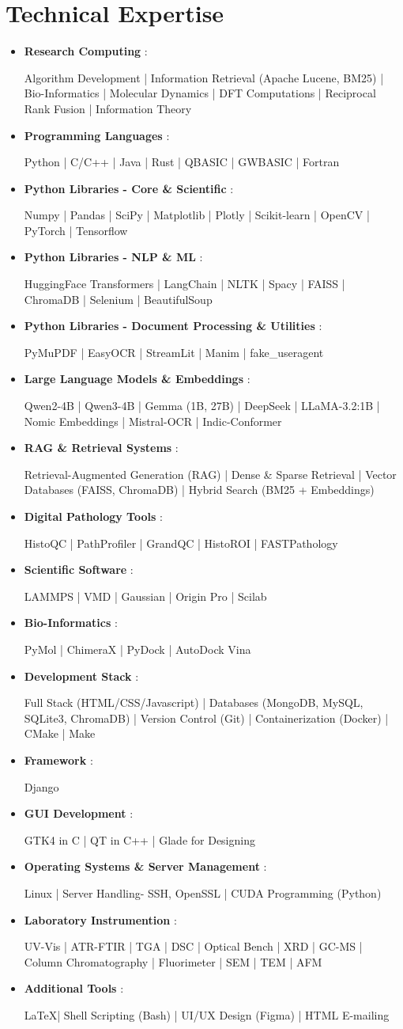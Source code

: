 \documentclass[a4paper,9pt]{article}
\newcommand{\skillBlock}[2]{
    \item \textbf{#1} : 
        \raggedright\small{#2}
    \vspace{-2pt}
}
\newcommand{\compactSection}[2]{
    \section{#1}
    \vspace{-0.1cm}
    #2
    \vspace{-0.2cm}
}
\begin{document}
\compactSection{Technical Expertise}{
\begin{itemize}[leftmargin=0.15in,label={},itemsep=2pt]
    \skillBlock{Research Computing}{Algorithm Development | Information Retrieval (Apache Lucene, BM25) | Bio-Informatics | Molecular Dynamics | DFT Computations | Reciprocal Rank Fusion | Information Theory}
    \skillBlock{Programming Languages}{Python | C/C++ | Java | Rust | QBASIC | GWBASIC | Fortran}
    \skillBlock{Python Libraries - Core \& Scientific}{Numpy | Pandas | SciPy | Matplotlib | Plotly | Scikit-learn | OpenCV | PyTorch | Tensorflow}
    \skillBlock{Python Libraries - NLP \& ML}{HuggingFace Transformers | LangChain | NLTK | Spacy | FAISS | ChromaDB | Selenium | BeautifulSoup}
    \skillBlock{Python Libraries - Document Processing \& Utilities}{PyMuPDF | EasyOCR | StreamLit | Manim | fake\_useragent}
    \skillBlock{Large Language Models \& Embeddings}{Qwen2-4B | Qwen3-4B | Gemma (1B, 27B) | DeepSeek | LLaMA-3.2:1B | Nomic Embeddings | Mistral-OCR | Indic-Conformer}
    \skillBlock{RAG \& Retrieval Systems}{Retrieval-Augmented Generation (RAG) | Dense \& Sparse Retrieval | Vector Databases (FAISS, ChromaDB) | Hybrid Search (BM25 + Embeddings)}
    \skillBlock{Digital Pathology Tools}{HistoQC | PathProfiler | GrandQC | HistoROI | FASTPathology}
    \skillBlock{Scientific Software}{LAMMPS | VMD | Gaussian | Origin Pro | Scilab}
    \skillBlock{Bio-Informatics}{PyMol | ChimeraX | PyDock | AutoDock Vina}
    \skillBlock{Development Stack}{Full Stack (HTML/CSS/Javascript) | Databases (MongoDB, MySQL, SQLite3, ChromaDB) | Version Control (Git) | Containerization (Docker) | CMake | Make}
    \skillBlock{Framework}{Django}
    \skillBlock{GUI Development}{GTK4 in C | QT in C++ | Glade for Designing}
    \skillBlock{Operating Systems \& Server Management}{Linux | Server Handling- SSH, OpenSSL | CUDA Programming (Python)}
    \skillBlock{Laboratory Instrumention}{UV-Vis | ATR-FTIR | TGA | DSC | Optical Bench | XRD | GC-MS | Column Chromatography | Fluorimeter | SEM | TEM | AFM}
    \skillBlock{Additional Tools}{\LaTeX | Shell Scripting (Bash) | UI/UX Design (Figma) | HTML E-mailing}
\end{itemize}
}
\end{document}
